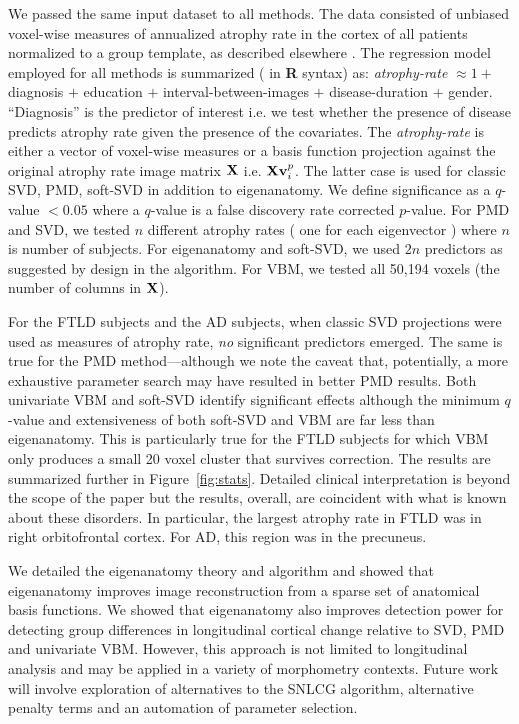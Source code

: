 \documentclass{llncs}
\newcommand{\X}{{\bf X}}
\newcommand{\vv}{{\bf v}}
\begin{document}
We passed the same input dataset to all methods.  The data consisted of unbiased voxel-wise measures of annualized atrophy rate in the cortex of all patients normalized to a group template, as described elsewhere \cite{anon}.  The regression model employed for all methods is summarized ( in {\bf R} syntax) as: {\em atrophy-rate} $\approx 1 +$ diagnosis $+$ education $+$ interval-between-images $+$ disease-duration + gender.  ``Diagnosis'' is the predictor of interest i.e. we test whether the presence of disease predicts atrophy rate given the presence of the covariates.  The {\em atrophy-rate} is either a vector of voxel-wise measures or a basis function projection against the original atrophy rate image matrix $\X$ i.e. $\X \vv_i^p$.   The latter case is used for classic SVD, PMD, soft-SVD in addition to eigenanatomy.  We define significance as a $q$-value $< 0.05$ where a $q$-value is a false discovery rate corrected $p$-value.  For PMD and SVD, we tested $n$ different atrophy rates ( one for each eigenvector ) where $n$ is number of subjects.  For eigenanatomy and soft-SVD, we used $2n$ predictors as suggested by design in the algorithm.  For VBM, we tested all 50,194 voxels (the number of columns in $\X$).

For the FTLD subjects and the AD subjects, when classic SVD projections were used as measures of atrophy rate, {\em no} significant predictors emerged.  The same is true for the PMD method---although we note the caveat that, potentially, a more exhaustive parameter search may have resulted in better PMD results.  Both univariate VBM and soft-SVD identify significant effects although the minimum $q$-value and extensiveness of both soft-SVD and VBM are far less than eigenanatomy.  This is particularly true for the FTLD subjects for which VBM only produces a small 20 voxel cluster that survives correction.  The results are summarized further in Figure~\ref{fig:stats}.  Detailed clinical interpretation is beyond the scope of the paper but the results, overall, are coincident with what is known about these disorders.  In particular, the largest atrophy rate in FTLD was in right orbitofrontal cortex.  For AD, this region was in the precuneus.  
\newline


 \newline \newline We detailed the eigenanatomy theory and algorithm and showed that eigenanatomy improves image reconstruction from a sparse set of anatomical basis functions.  We showed that eigenanatomy also improves detection power for detecting group differences in longitudinal cortical change relative to SVD, PMD and univariate VBM.  However, this approach is not limited to longitudinal analysis and may be applied in a variety of morphometry contexts.  Future work will involve exploration of alternatives to the SNLCG algorithm, alternative penalty terms and an automation of parameter selection.



\end{document}
